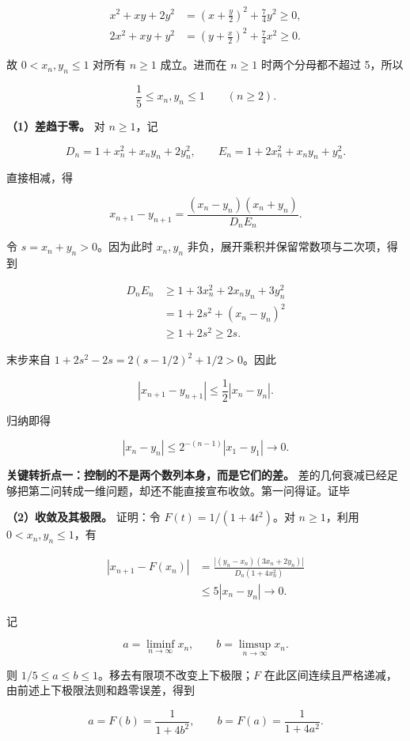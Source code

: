 \documentclass[11pt,a4paper]{article}
\begin{document}
\[
\begin{aligned}
x^2+xy+2y^2&=\left(x+\frac y2\right)^2+\frac74y^2\ge0,\\
2x^2+xy+y^2&=\left(y+\frac x2\right)^2+\frac74x^2\ge0.
\end{aligned}
\]

故 \(0<x_n,y_n\le1\) 对所有 \(n\ge1\) 成立。进而在 \(n\ge1\)
时两个分母都不超过 5，所以

\[
\frac15\le x_n,y_n\le1\qquad(n\ge2).
\]

\textbf{（1）差趋于零。} 对 \(n\ge1\)，记

\[
D_n=1+x_n^2+x_ny_n+2y_n^2,\qquad
E_n=1+2x_n^2+x_ny_n+y_n^2.
\]

直接相减，得

\[
x_{n+1}-y_{n+1}
=\frac{(x_n-y_n)(x_n+y_n)}{D_nE_n}.
\]

令 \(s=x_n+y_n>0\)。因为此时 \(x_n,y_n\)
非负，展开乘积并保留常数项与二次项，得到

\[
\begin{aligned}
D_nE_n
&\ge1+3x_n^2+2x_ny_n+3y_n^2\\
&=1+2s^2+(x_n-y_n)^2\\
&\ge1+2s^2\ge2s.
\end{aligned}
\]

末步来自 \(1+2s^2-2s=2(s-1/2)^2+1/2>0\)。因此

\[
|x_{n+1}-y_{n+1}|\le\frac12|x_n-y_n|.
\]

归纳即得

\[
|x_n-y_n|\le2^{-(n-1)}|x_1-y_1|\longrightarrow0.
\]

\textbf{关键转折点一：控制的不是两个数列本身，而是它们的差。}
差的几何衰减已经足够把第二问转成一维问题，却还不能直接宣布收敛。第一问得证。证毕

\textbf{（2）收敛及其极限。} 证明：令 \(F(t)=1/(1+4t^2)\)。对
\(n\ge1\)，利用 \(0<x_n,y_n\le1\)，有

\[
\begin{aligned}
\left|x_{n+1}-F(x_n)\right|
&=\frac{|(y_n-x_n)(3x_n+2y_n)|}
{D_n(1+4x_n^2)}\\
&\le5|x_n-y_n|\longrightarrow0.
\end{aligned}
\]

记

\[
a=\liminf_{n\to\infty}x_n,\qquad
b=\limsup_{n\to\infty}x_n.
\]

则 \(1/5\le a\le b\le1\)。移去有限项不改变上下极限；\(F\)
在此区间连续且严格递减，由前述上下极限法则和趋零误差，得到

\[
a=F(b)=\frac1{1+4b^2},\qquad
b=F(a)=\frac1{1+4a^2}.
\]
\end{document}
